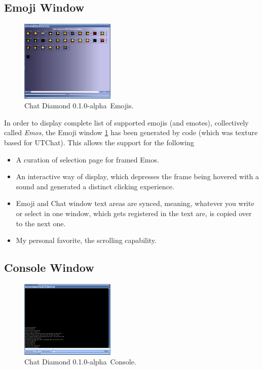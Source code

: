 \documentclass{article}
\theoremstyle{definition}
\newcommand{\ChatDiamondVersion}{0.1.0-alpha}
\begin{document}
\subsection{Emoji Window}

\begin{figure}
\centering
\includegraphics[width=0.4\textwidth]{img_emos}
\caption{Chat Diamond \ChatDiamondVersion~Emojis.}
\label{fig:chatdiamond_emos}
\end{figure}

In order to display complete list of supported emojis (and emotes), collectively called \emph{Emos}, the Emoji window \ref{fig:chatdiamond_emos} has been 
generated by code (which was texture based for UTChat).  This allows the support for the following 
\begin{itemize}
\item A curation of selection page for framed Emos.
\item An interactive way of display, which depresses the frame being hovered with a sound and generated a distinct clicking
experience.
\item Emoji and Chat window text areas are synced, meaning, whatever you write or select in one window, which gets registered
in the text are, is copied over to the next one.
\item My personal favorite, the scrolling capability.
\end{itemize}


\subsection{Console Window}

\begin{figure}
\centering
\includegraphics[width=0.4\textwidth]{img_console}
\caption{Chat Diamond \ChatDiamondVersion~Console.}
\label{fig:chatdiamond_console}
\end{figure}
\end{document}
